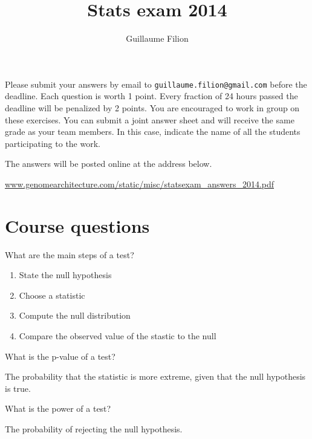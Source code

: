 \documentclass[12pt]{article}
\title{Stats exam 2014}
\author{Guillaume Filion}
\begin{document}
\maketitle

Please submit your answers by email to
\texttt{guillaume.filion@gmail.com} before the deadline. Each
question is worth 1 point. Every fraction of 24 hours passed
the deadline will be penalized by 2 points. You are encouraged
to work in group on these exercises.
You can submit a joint answer sheet and will receive the same
grade as your team members. In this case, indicate the name of
all the students participating to the work.

The answers will be posted online at the address below. \par
\noindent \url{www.genomearchitecture.com/static/misc/statsexam_answers_2014.pdf}

\section{Course questions}

\begin{Exercise}[label={exo1}]
  What are the main steps of a test?
\end{Exercise}
\begin{Answer}[ref={exo1}]
  \begin{enumerate}
    \item State the null hypothesis
    \item Choose a statistic
    \item Compute the null distribution
    \item Compare the observed value of the stastic to the null
  \end{enumerate}
\end{Answer}

\begin{Exercise}[label={exo2}]
  What is the p-value of a test?
\end{Exercise}
\begin{Answer}[ref={exo2}]
  The probability that the statistic is more extreme, given that
  the null hypothesis is true.
\end{Answer}

\begin{Exercise}[label={exo3}]
  What is the power of a test?
\end{Exercise}
\begin{Answer}[ref={exo3}]
  The probability of rejecting the null hypothesis.
\end{Answer}
\end{document}
